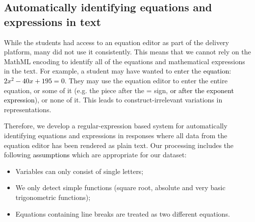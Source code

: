 \documentclass[11pt,a4paper]{article}
\newcommand{\AC}{\textcolor{black}} %
\newcommand{\AV}{\textcolor{red}} %
\begin{document}

\subsection{Automatically identifying equations and expressions in text}
\label{subsection:equation_identification}

While the students had access to an equation editor as part of the delivery platform, many did not use it consistently. This means that we cannot rely on the MathML encoding to identify all of the equations and mathematical expressions in the text. For example, a student may have wanted to enter the \AC{equation: $ 2x^2 - 40x + 195 = 0$}. They may use the equation editor to enter the entire equation, or some of it (e.g. the piece after the = sign, \AC{or after the exponent expression}), or none of it. This leads to construct-irrelevant variations in representations. 


Therefore, we develop a regular-expression based system for automatically identifying equations and expressions in responses where all data from the equation editor has been rendered as plain text. %
Our processing includes the following \AC{assumptions} which are appropriate for our dataset:

\begin{itemize}
 \item Variables can only consist of single letters;
 \item We only detect simple functions (square root, absolute and very basic trigonometric functions);
 \item Equations containing line breaks are treated as two different equations.
\end{itemize}
\end{document}
